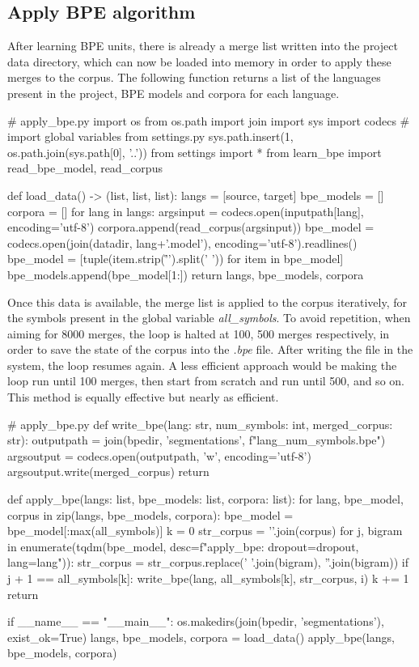 \subsection{Apply BPE algorithm}

After learning BPE units, there is already a merge list written into the project data directory, which can now be loaded into memory in order to apply these merges to the corpus. The following function returns a list of the languages present in the project, BPE models and corpora for each language.

\begin{python}
# apply_bpe.py
import os
from os.path import join
import sys
import codecs
# import global variables from settings.py
sys.path.insert(1, os.path.join(sys.path[0], '..'))
from settings import *
from learn_bpe import read_bpe_model, read_corpus

def load_data() -> (list, list, list):
  langs = [source, target]
  bpe_models = []
  corpora = []
  for lang in langs:
    argsinput = codecs.open(inputpath[lang], encoding='utf-8')
    corpora.append(read_corpus(argsinput))
    bpe_model = codecs.open(join(datadir, lang+'.model'), encoding='utf-8').readlines()
    bpe_model = [tuple(item.strip('\r\n ').split(' ')) for item in bpe_model]
    bpe_models.append(bpe_model[1:])
  return langs, bpe_models, corpora
\end{python}

Once this data is available, the merge list is applied to the corpus iteratively, for the symbols present in the global variable \emph{all\_symbols}. To avoid repetition, when aiming for 8000 merges, the loop is halted at 100, 500 merges respectively, in order to save the state of the corpus into the \emph{.bpe} file. After writing the file in the system, the loop resumes again. A less efficient approach would be making the loop run until 100 merges, then start from scratch and run until 500, and so on. This method is equally effective but nearly as efficient.

\begin{python}
# apply_bpe.py
def write_bpe(lang: str, num_symbols: int, merged_corpus: str):
  outputpath = join(bpedir, 'segmentations', f"{lang}_{num_symbols}.bpe")
  argsoutput = codecs.open(outputpath, 'w', encoding='utf-8')
  argsoutput.write(merged_corpus)
  return

def apply_bpe(langs: list, bpe_models: list, corpora: list):
  for lang, bpe_model, corpus in zip(langs, bpe_models, corpora):
    bpe_model = bpe_model[:max(all_symbols)]
    k = 0
    str_corpus = '\n'.join(corpus)
    for j, bigram in enumerate(tqdm(bpe_model, desc=f"apply_bpe: dropout={dropout}, lang={lang}")):
      str_corpus = str_corpus.replace(' '.join(bigram), ''.join(bigram))
      if j + 1 == all_symbols[k]:
        write_bpe(lang, all_symbols[k], str_corpus, i)
        k += 1
  return

if __name__ == "__main__":
  os.makedirs(join(bpedir, 'segmentations'), exist_ok=True)
  langs, bpe_models, corpora = load_data()
  apply_bpe(langs, bpe_models, corpora)
\end{python}

